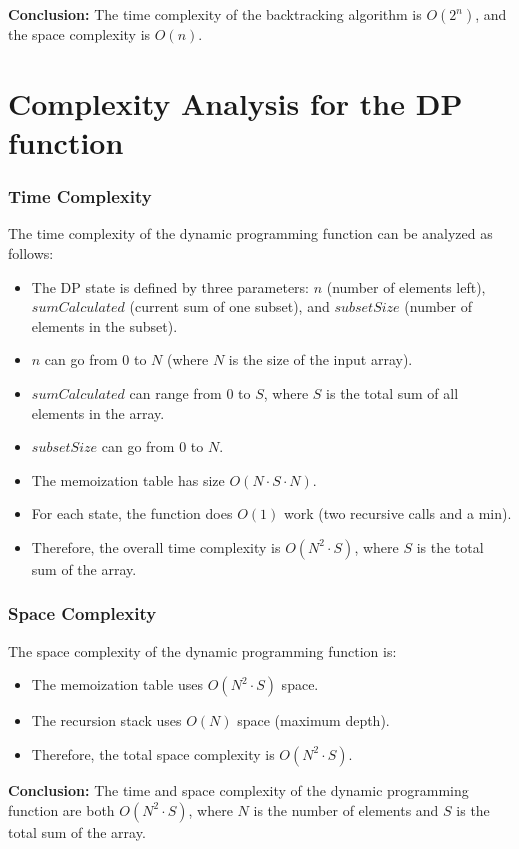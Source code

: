 \documentclass{article}
\begin{document}
\textbf{Conclusion:} The time complexity of the backtracking algorithm is $O(2^n)$, and the space complexity is $O(n)$.

\newpage

\section*{Complexity Analysis for the DP function}

\subsubsection*{Time Complexity}
The time complexity of the dynamic programming function can be analyzed as follows:
\begin{itemize}
    \item The DP state is defined by three parameters: $n$ (number of elements left), $sumCalculated$ (current sum of one subset), and $subsetSize$ (number of elements in the subset).
    \item $n$ can go from $0$ to $N$ (where $N$ is the size of the input array).
    \item $sumCalculated$ can range from $0$ to $S$, where $S$ is the total sum of all elements in the array.
    \item $subsetSize$ can go from $0$ to $N$.
    \item The memoization table has size $O(N \cdot S \cdot N)$.
    \item For each state, the function does $O(1)$ work (two recursive calls and a min).
    \item Therefore, the overall time complexity is $O(N^2 \cdot S)$, where $S$ is the total sum of the array.
\end{itemize}

\subsubsection*{Space Complexity}
The space complexity of the dynamic programming function is:
\begin{itemize}
    \item The memoization table uses $O(N^2 \cdot S)$ space.
    \item The recursion stack uses $O(N)$ space (maximum depth).
    \item Therefore, the total space complexity is $O(N^2 \cdot S)$.
\end{itemize}

\textbf{Conclusion:} The time and space complexity of the dynamic programming function are both $O(N^2 \cdot S)$, where $N$ is the number of elements and $S$ is the total sum of the array.
\end{document}
